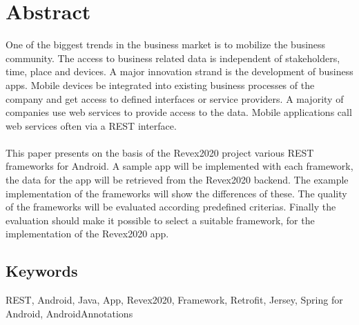 \chapter*{Abstract}
One of the biggest trends in the business market is to mobilize the business community. The access to business related data is independent of stakeholders, time, place and devices. A major innovation strand is the development of business apps. Mobile devices be integrated into existing business processes of the company and get access to defined interfaces or service providers. A majority of companies use web services to provide access to the data. Mobile applications call web services often via a REST interface.
\\\\
This paper presents on the basis of the Revex2020 project various REST frameworks for Android. A sample app will be implemented with each framework, the data for the app will be retrieved from the Revex2020 backend. The example implementation of the frameworks will show the differences of these. The quality of the frameworks will be evaluated according predefined criterias. Finally the evaluation should make it possible to select a suitable framework, for the implementation of the Revex2020 app.

\section*{Keywords}
REST, Android, Java, App, Revex2020, Framework, Retrofit, Jersey, Spring for Android, AndroidAnnotations

